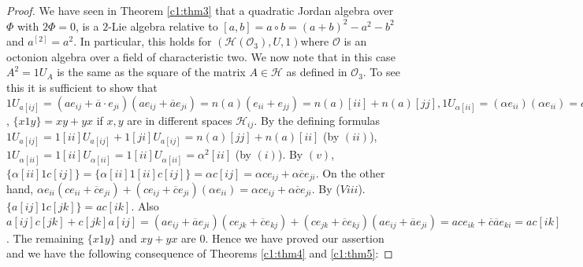\begin{proof}
We have seen in Theorem \ref{c1:thm3} that a quadratic Jordan algebra
over $\Phi$ with $2\Phi=0$, is a $2$-Lie algebra relative to
$[a,b]=a\circ b= (a+b)^{2}-a^{2}-b^{2}$ and $a^{[2]}=a^{2}$. In
particular, this holds for
$(\mathscr{H}(\mathcal{O}_3),U,1)$\pageoriginale where $\mathcal{O}$
is an octonion algebra over a field of characteristic two. We now note
that in this case $A^{2}=1U_A$ is the same as the square of the matrix
$A\in\mathscr{H}$ as defined in $\mathcal{O}_3$. To see this it
is sufficient to show that $1U_{a[ij]}=(ae_{ij}+\overline{a}\cdot
e_{ji})(ae_{ij}+\overline{a}
e_{ji})=n(a)(e_{ii}+e_{jj})=n(a)[ii]+n(a)[jj],1U_{\alpha[ii]}=(\alpha
e_{ii})(\alpha e_{ii})=\alpha^{2}[ii]$, $\{x1y\}=xy+yx$ if $x,y$ are
in different spaces $\mathscr{H}_{ij}$. By the defining formulas
$1U_{a[ij]}=1[ii]U_{a[ij]}+1[ji]U_{a[ij]}=n(a)[jj]+n(a)[ii]$ (by
$(ii)$), $1U_{\alpha[ii]}=1[ii]U_{\alpha[ii]}=1[ii]
U_{\alpha[ii]}=\alpha^{2}[ii]$ (by $(i)$). By
$(v)$,$\{\alpha[ii]1c[ij]\}=\{\alpha[ii]1[ii]c [ij]\}=\alpha
c[ij]=\alpha c e_{ij}+\alpha \overline{c} e_{ji}$. On the other hand,
$\alpha e_{ii}(c e_{ii}+\overline{c} e_{ji})+(c e_{ij}+\overline{c}
e_{ji})(\alpha e_{ii})=\alpha c e_{ij}+ \alpha \overline{c}
e_{ji}$. By ($Viii$). $\{a[ij]1c[jk]\}=ac[ik]$. Also $a[ij]c[jk]+c[jk]
a[ij]=(ae_{ij}+\overline{a} e_{ji})(c e_{jk}+\overline{c} e_{kj})+(c
e_{jk}+\overline{c} e_{kj}) (a e_{ij}+\overline{a} e_{ji})=ac e_{ik}
+\overline{c}\overline{a} e_{ki}=ac[ik]$. The remaining $\{x1y\}$ and
$xy+yx$ are $0$. Hence we have proved our assertion and we have the
following consequence of Theorems \ref{c1:thm4} and \ref{c1:thm5}:
\end{proof}

